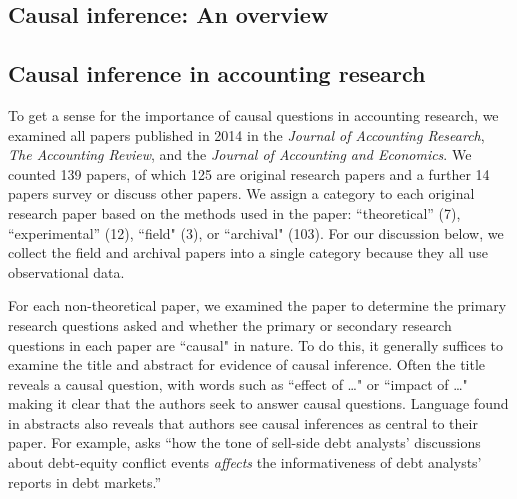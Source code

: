 \documentclass[11pt,reqno,titlepage]{amsart}
\begin{document}
\begin{doublespace}
\section{Causal inference: An overview} \label{sec:causal}

\subsection{Causal inference in accounting research}


To get a sense for the importance of causal questions in accounting research,
we examined all papers published in 2014 in the \textit{Journal of Accounting Research}, \textit{The Accounting Review}, and the \textit{Journal of Accounting and Economics}.
We counted 139 papers, of which 125 are original research papers and a further 14 papers survey or discuss other papers.
We assign a category to each original research paper based on the methods used in the paper: ``theoretical'' (7), ``experimental'' (12), ``field" (3), or ``archival" (103). 
For our discussion below, we collect the field and archival papers into a single category because they all use observational data.

For each non-theoretical paper, we examined the paper to determine the primary research questions asked and whether the primary or secondary research questions in each paper are ``causal" in nature.
To do this, it generally suffices to examine the title and abstract for evidence of causal inference. 
Often the title reveals a causal question, with words such as  ``effect of \dots" or ``impact of \dots"  
\citep[e.g.][]{Cohen:2014jl,Clorproell:2014cv} making it clear that the authors seek to answer causal questions. 
Language found in abstracts also reveals that authors see causal inferences as central to their paper. 
For example, \citet{deFranco:2014ct} asks ``how the tone of sell-side debt analysts' discussions about debt-equity conflict events \emph{affects} the informativeness of debt analysts’ reports in debt markets.''


\end{doublespace}
\end{document}
